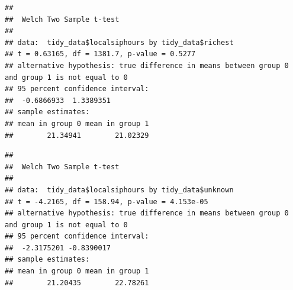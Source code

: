 \documentclass[
  11 pt,
]{article}
\newenvironment{Shaded}{\begin{snugshade}}{\end{snugshade}}
\newcommand{\AttributeTok}[1]{\textcolor[rgb]{0.77,0.63,0.00}{#1}}
\newcommand{\CommentTok}[1]{\textcolor[rgb]{0.56,0.35,0.01}{\textit{#1}}}
\newcommand{\ConstantTok}[1]{\textcolor[rgb]{0.00,0.00,0.00}{#1}}
\newcommand{\FunctionTok}[1]{\textcolor[rgb]{0.00,0.00,0.00}{#1}}
\newcommand{\NormalTok}[1]{#1}
\newcommand{\SpecialCharTok}[1]{\textcolor[rgb]{0.00,0.00,0.00}{#1}}
\begin{document}
\begin{Shaded}
\end{Shaded}

\begin{verbatim}
## 
##  Welch Two Sample t-test
## 
## data:  tidy_data$localsiphours by tidy_data$richest
## t = 0.63165, df = 1381.7, p-value = 0.5277
## alternative hypothesis: true difference in means between group 0 and group 1 is not equal to 0
## 95 percent confidence interval:
##  -0.6866933  1.3389351
## sample estimates:
## mean in group 0 mean in group 1 
##        21.34941        21.02329
\end{verbatim}

\begin{Shaded}
\end{Shaded}

\begin{verbatim}
## 
##  Welch Two Sample t-test
## 
## data:  tidy_data$localsiphours by tidy_data$unknown
## t = -4.2165, df = 158.94, p-value = 4.153e-05
## alternative hypothesis: true difference in means between group 0 and group 1 is not equal to 0
## 95 percent confidence interval:
##  -2.3175201 -0.8390017
## sample estimates:
## mean in group 0 mean in group 1 
##        21.20435        22.78261
\end{verbatim}

\begin{Shaded}
\end{Shaded}
\end{document}
